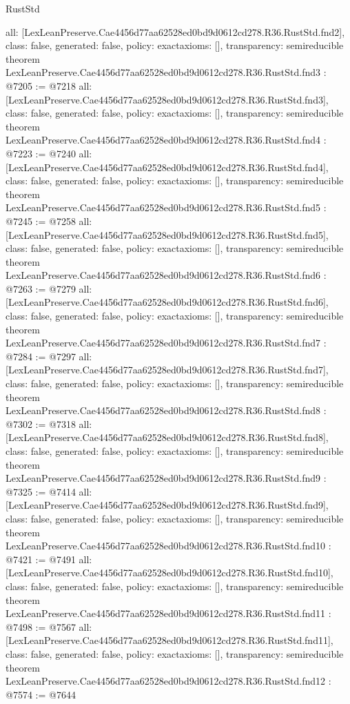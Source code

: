 \begin{lexlean}{RustStd}
\begin{coremodule}
{  all: [LexLeanPreserve.Cae4456d77aa62528ed0bd9d0612cd278.R36.RustStd.fnd2],
  class: false,
  generated: false,
  policy: exact{axioms: []},
  transparency: semireducible
}
theorem LexLeanPreserve.Cae4456d77aa62528ed0bd9d0612cd278.R36.RustStd.fnd3 : @7205 := @7218 {
  all: [LexLeanPreserve.Cae4456d77aa62528ed0bd9d0612cd278.R36.RustStd.fnd3],
  class: false,
  generated: false,
  policy: exact{axioms: []},
  transparency: semireducible
}
theorem LexLeanPreserve.Cae4456d77aa62528ed0bd9d0612cd278.R36.RustStd.fnd4 : @7223 := @7240 {
  all: [LexLeanPreserve.Cae4456d77aa62528ed0bd9d0612cd278.R36.RustStd.fnd4],
  class: false,
  generated: false,
  policy: exact{axioms: []},
  transparency: semireducible
}
theorem LexLeanPreserve.Cae4456d77aa62528ed0bd9d0612cd278.R36.RustStd.fnd5 : @7245 := @7258 {
  all: [LexLeanPreserve.Cae4456d77aa62528ed0bd9d0612cd278.R36.RustStd.fnd5],
  class: false,
  generated: false,
  policy: exact{axioms: []},
  transparency: semireducible
}
theorem LexLeanPreserve.Cae4456d77aa62528ed0bd9d0612cd278.R36.RustStd.fnd6 : @7263 := @7279 {
  all: [LexLeanPreserve.Cae4456d77aa62528ed0bd9d0612cd278.R36.RustStd.fnd6],
  class: false,
  generated: false,
  policy: exact{axioms: []},
  transparency: semireducible
}
theorem LexLeanPreserve.Cae4456d77aa62528ed0bd9d0612cd278.R36.RustStd.fnd7 : @7284 := @7297 {
  all: [LexLeanPreserve.Cae4456d77aa62528ed0bd9d0612cd278.R36.RustStd.fnd7],
  class: false,
  generated: false,
  policy: exact{axioms: []},
  transparency: semireducible
}
theorem LexLeanPreserve.Cae4456d77aa62528ed0bd9d0612cd278.R36.RustStd.fnd8 : @7302 := @7318 {
  all: [LexLeanPreserve.Cae4456d77aa62528ed0bd9d0612cd278.R36.RustStd.fnd8],
  class: false,
  generated: false,
  policy: exact{axioms: []},
  transparency: semireducible
}
theorem LexLeanPreserve.Cae4456d77aa62528ed0bd9d0612cd278.R36.RustStd.fnd9 : @7325 := @7414 {
  all: [LexLeanPreserve.Cae4456d77aa62528ed0bd9d0612cd278.R36.RustStd.fnd9],
  class: false,
  generated: false,
  policy: exact{axioms: []},
  transparency: semireducible
}
theorem LexLeanPreserve.Cae4456d77aa62528ed0bd9d0612cd278.R36.RustStd.fnd10 : @7421 := @7491 {
  all: [LexLeanPreserve.Cae4456d77aa62528ed0bd9d0612cd278.R36.RustStd.fnd10],
  class: false,
  generated: false,
  policy: exact{axioms: []},
  transparency: semireducible
}
theorem LexLeanPreserve.Cae4456d77aa62528ed0bd9d0612cd278.R36.RustStd.fnd11 : @7498 := @7567 {
  all: [LexLeanPreserve.Cae4456d77aa62528ed0bd9d0612cd278.R36.RustStd.fnd11],
  class: false,
  generated: false,
  policy: exact{axioms: []},
  transparency: semireducible
}
theorem LexLeanPreserve.Cae4456d77aa62528ed0bd9d0612cd278.R36.RustStd.fnd12 : @7574 := @7644 {
}
\end{coremodule}
\end{lexlean}
